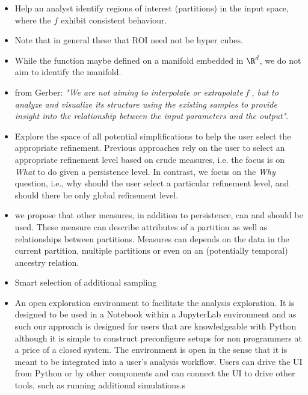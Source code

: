 \begin{itemize}
    \item Help an analyst identify regions of interest (partitions) in the input space, where the $f$ exhibit consistent behaviour. 
    
    \item Note that in general these that ROI need not be hyper cubes.

    \item While the function maybe defined on a manifold embedded in $\R^d$, we do not aim to identify the manifold. 
    
    \item from Gerber:
    \textit{"We are not aiming to interpolate or extrapolate f , but to analyze and visualize its structure using the existing samples to provide insight into the relationship between the input parameters and the output"}. 

    \item Explore the space of all potential simplifications to help the user select the appropriate refinement. Previous approaches rely on the user to select an appropriate refinement level based on crude measures, i.e. the focus is on \textit{What} to do given a persistence level. In contrast, we focus on the \textit{Why} question, i.e., why should the user select a particular refinement level, and should there be only global refinement level. 
    
    \item we propose that other measures, in addition to persistence, can and should be used. These measure can describe attributes of a partition as well as relationships between partitions. Measures can depends on the data in the current partition,  multiple partitions or even on an (potentially temporal) ancestry relation.

    \item Smart selection of additional sampling 
    
    \item An open exploration environment to facilitate the analysis exploration. It is designed to be used in a Notebook within a JupyterLab environment and as such our approach is designed for users that are knowledgeable with Python although it is simple to construct preconfigure setups for non programmers at a price of a closed system. The environment is open in the sense that it is meant to be integrated into a user's analysis workflow. Users can drive the UI from Python or by other components and can connect the UI to drive other tools, such as running additional simulations.s

\end{itemize}

